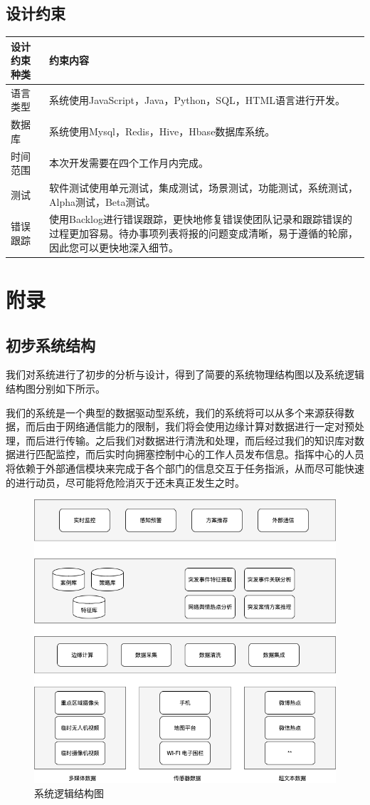 \documentclass{ctexrep}
\begin{document}
\section{设计约束}
\begin{longtable}{p{2cm}|p{10cm}}
	\hline
	设计约束种类 & 约束内容 \\
	\hline
	\hline
	语言类型& 系统使用JavaScript，Java，Python，SQL，HTML语言进行开发。\\
	\hline
	数据库 & 系统使用Mysql，Redis，Hive，Hbase数据库系统。 \\
	\hline
	时间范围 & 本次开发需要在四个工作月内完成。\\
	\hline
	测试 & 软件测试使用单元测试，集成测试，场景测试，功能测试，系统测试，Alpha测试，Beta测试。\\
	\hline
	错误跟踪 & 使用Backlog进行错误跟踪，更快地修复错误使团队记录和跟踪错误的过程更加容易。待办事项列表将报的问题变成清晰，易于遵循的轮廓，因此您可以更快地深入细节。\\
	\hline
	\end{longtable}
\chapter{附录}
\section{初步系统结构}
我们对系统进行了初步的分析与设计，得到了简要的系统物理结构图以及系统逻辑结构图分别如下所示。

我们的系统是一个典型的数据驱动型系统，我们的系统将可以从多个来源获得数据，而后由于网络通信能力的限制，我们将会使用边缘计算对数据进行一定对预处理，而后进行传输。之后我们对数据进行清洗和处理，而后经过我们的知识库对数据进行匹配监控，而后实时向拥塞控制中心的工作人员发布信息。指挥中心的人员将依赖于外部通信模块来完成于各个部门的信息交互于任务指派，从而尽可能快速的进行动员，尽可能将危险消灭于还未真正发生之时。
\begin{figure}[H]
	\centering
	\includegraphics[scale=0.4]{img/logical.png}
	\caption{系统逻辑结构图}
\end{figure}
\end{document}
